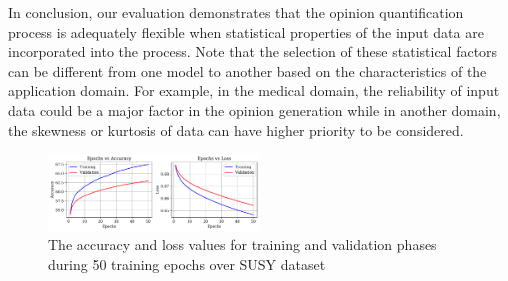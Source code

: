 In conclusion, our evaluation demonstrates that the opinion quantification process is adequately flexible when statistical properties of the input data are incorporated into the process. Note that the selection of these statistical factors can be different from one model to another based on the characteristics of the application domain. For example, in the medical domain, the reliability of input data could be a major factor in the opinion generation while in another domain, the skewness or kurtosis of data can have higher priority to be considered.







\begin{figure}[ht]  %
\centering
\includegraphics[width=0.5\textwidth]{figures/Results_susy.pdf}
\caption{The accuracy and loss values for training and validation phases during 50 training epochs over SUSY dataset}
\label{susy_loss}
\end{figure}


